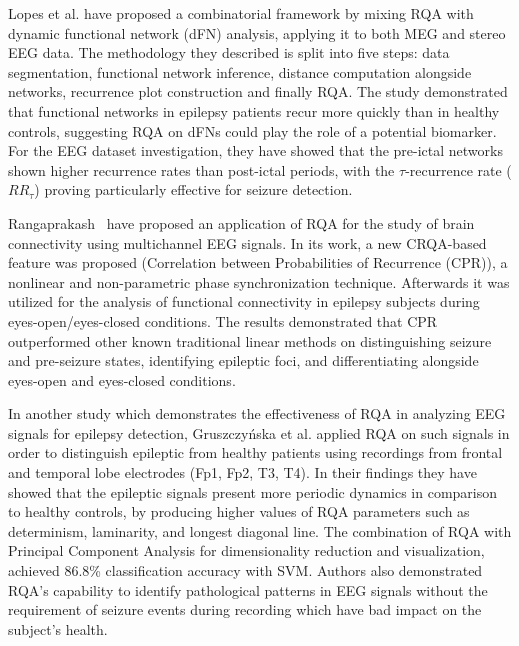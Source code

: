 \documentclass{article}
\begin{document}
			Lopes et al. \cite{lopes} have proposed a 
			combinatorial framework 
			by mixing RQA with dynamic functional network (dFN) analysis,
			applying it to both MEG and stereo EEG data. 
			The methodology they described is split 
			into five steps: data segmentation, 
			functional network inference, distance computation alongside networks, 
			recurrence plot construction and finally RQA. 
			The study demonstrated that functional networks in epilepsy 
			patients recur more quickly than in healthy controls, suggesting RQA on
			dFNs could play the role of a potential biomarker.
			For the EEG dataset investigation, they have showed that the pre-ictal 
			networks shown higher recurrence rates 
			than post-ictal periods, with the $\tau$-recurrence rate ($RR_{\tau}$) proving particularly 
			effective for seizure detection.
			
			Rangaprakash~\cite{rangaprakash2014} have proposed an application of RQA for the study of
			brain connectivity using multichannel EEG signals. In its work,
			a new CRQA-based feature was proposed (Correlation between 
			Probabilities of Recurrence (CPR)), a nonlinear and non-parametric 
			phase synchronization technique. Afterwards it was utilized for the analysis 
			of functional connectivity in epilepsy subjects during eyes-open/eyes-closed conditions.
			The results demonstrated that CPR outperformed other known traditional 
			linear methods on distinguishing seizure and pre-seizure states, 
			identifying epileptic foci, and differentiating alongside eyes-open and eyes-closed conditions. 

			In another study which demonstrates the effectiveness of RQA in 
			analyzing EEG signals for epilepsy detection,
			Gruszczyńska et al.\cite{gruszczynska2019} applied RQA on such signals
			in order to distinguish epileptic from healthy patients using recordings 
			from frontal and temporal lobe electrodes (Fp1, Fp2, T3, T4). 
			In their findings they have showed that the epileptic signals present more periodic
			dynamics in comparison to healthy controls, by producing higher values of 
			RQA parameters such as determinism,
			laminarity, and longest diagonal line. The combination of RQA with
			Principal Component Analysis for dimensionality reduction and visualization, achieved 86.8\% 
			classification accuracy with SVM. Authors also demonstrated RQA's capability
			to identify pathological patterns in EEG signals without the 
			requirement of seizure events during recording which have bad impact on the subject's health.
\end{document}
